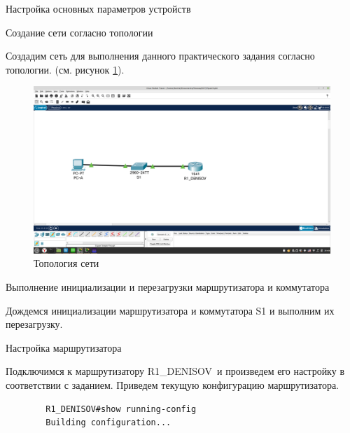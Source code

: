 \documentclass[a4paper,14pt]{extarticle}
\newcommand{\router}{R1\_DENISOV~}
\begin{document}
\begin{mypart}{Настройка основных параметров устройств}
	
	\begin{step}{Создание сети согласно топологии}
		
		Создадим сеть для выполнения данного практического задания согласно топологии. (см. рисунок \ref{fig:pr8-topology}).
		\begin{figure}[h!]
			\centering
			\includegraphics[width=1\linewidth]{images/pr8-topology}
			\caption{Топология сети}
			\label{fig:pr8-topology}
		\end{figure}
		
	\end{step}

\begin{step}{Выполнение инициализации и перезагрузки маршрутизатора и коммутатора}
	
	Дождемся инициализации маршрутизатора  и коммутатора S1 и выполним их перезагрузку.
	
\end{step}

\begin{step}{Настройка маршрутизатора}
	
	Подключимся к маршрутизатору \router и произведем его настройку в соответствии с заданием. Приведем текущую конфигурацию маршрутизатора. 
	\begin{lstlisting}
		R1_DENISOV#show running-config 
		Building configuration...
		

\end{lstlisting}
\end{step}
\end{mypart}
\end{document}
